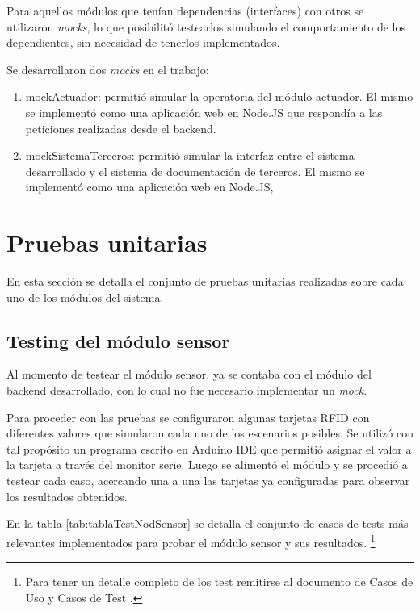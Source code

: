 Para aquellos módulos que tenían dependencias (interfaces) con otros se utilizaron \textit{mocks}, lo que posibilitó testearlos simulando el comportamiento de los dependientes, sin necesidad de tenerlos implementados.

Se desarrollaron dos \textit{mocks} en el trabajo:

\begin{enumerate}
\item mockActuador: permitió simular la operatoria del módulo actuador. El mismo se implementó como una aplicación web en Node.JS que respondía a las peticiones realizadas desde el backend.
\item mockSistemaTerceros: permitió simular la interfaz entre el sistema desarrollado y el sistema de documentación de terceros. El mismo se implementó como una aplicación web en Node.JS, 
\end{enumerate}
    
\clearpage
\section{Pruebas unitarias}

En esta sección se detalla el conjunto de pruebas unitarias realizadas sobre cada uno de los módulos del sistema.

\subsection{Testing del módulo sensor}

Al momento de testear el módulo sensor, ya se contaba con el módulo del backend desarrollado, con lo cual no fue necesario implementar un \textit{mock}.

Para proceder con las pruebas se configuraron algunas tarjetas RFID con diferentes valores que simularon cada uno de los escenarios posibles. Se utilizó con tal propósito un programa escrito en Arduino IDE que permitió asignar el valor a la tarjeta a través del monitor serie. Luego se alimentó el módulo y se procedió a testear cada caso, acercando una a una las tarjetas ya configuradas para observar los resultados obtenidos.

En la tabla \ref{tab:tablaTestNodSensor} se detalla el conjunto de casos de tests más relevantes implementados para probar el módulo sensor y sus resultados. \footnote{Para tener un detalle completo de los test remitirse al documento de Casos de Uso y Casos de Test \citep{WEBSITE:CasosUsoYTest}.}

